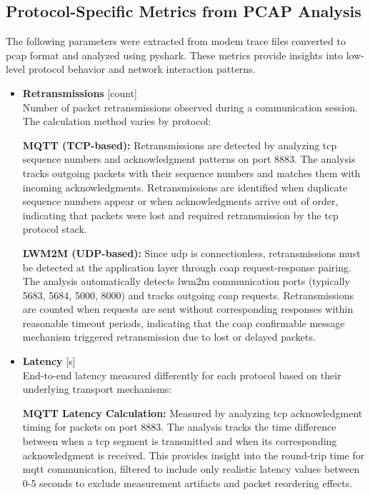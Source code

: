 \documentclass[12pt, english, openany]{book}
\begin{document}
\subsection*{Protocol-Specific Metrics from PCAP Analysis}

The following parameters were extracted from modem trace files converted to \gls{pcap} format and analyzed using pyshark. These metrics provide insights into low-level protocol behavior and network interaction patterns.

\begin{itemize}
    \item \textbf{Retransmissions} \hfill [count] \\
          Number of packet retransmissions observed during a communication session. The calculation method varies by protocol:

          \textbf{MQTT (TCP-based):} Retransmissions are detected by analyzing \gls{tcp} sequence numbers and acknowledgment patterns on port 8883. The analysis tracks outgoing packets with their sequence numbers and matches them with incoming acknowledgments. Retransmissions are identified when duplicate sequence numbers appear or when acknowledgments arrive out of order, indicating that packets were lost and required retransmission by the \gls{tcp} protocol stack.

          \textbf{LWM2M (UDP-based):} Since \gls{udp} is connectionless, retransmissions must be detected at the application layer through \gls{coap} request-response pairing. The analysis automatically detects \gls{lwm2m} communication ports (typically 5683, 5684, 5000, 8000) and tracks outgoing \gls{coap} requests. Retransmissions are counted when requests are sent without corresponding responses within reasonable timeout periods, indicating that the \gls{coap} confirmable message mechanism triggered retransmission due to lost or delayed packets.

    \item \textbf{Latency} \hfill [s] \\
          End-to-end latency measured differently for each protocol based on their underlying transport mechanisms:

          \textbf{MQTT Latency Calculation:} Measured by analyzing \gls{tcp} acknowledgment timing for packets on port 8883. The analysis tracks the time difference between when a \gls{tcp} segment is transmitted and when its corresponding acknowledgment is received. This provides insight into the round-trip time for \gls{mqtt} communication, filtered to include only realistic latency values between 0-5 seconds to exclude measurement artifacts and packet reordering effects.


\end{itemize}
\end{document}
